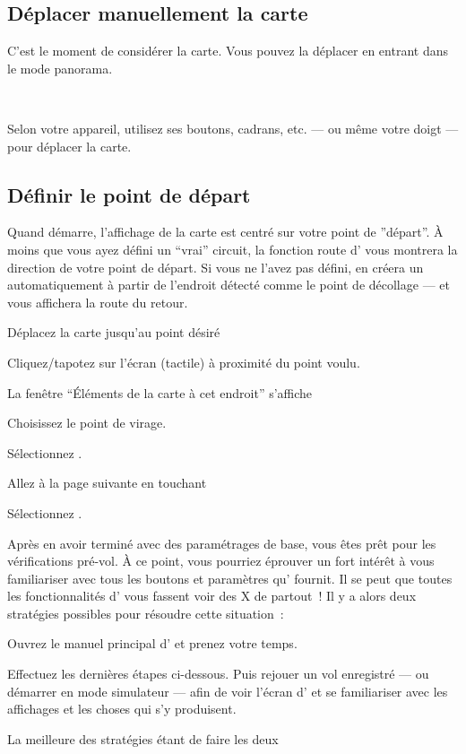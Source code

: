 \documentclass[french, a4paper, 12pt]{refrep}
\newcommand{\display}[3]{\bmenut{Display}{#1/2}{\LARGE$\triangleright$}~\bmenut{#2}{#3}}%
\begin{document}
\subsection{\textcolor{flashblue}{Déplacer manuellement la carte}}
C'est le moment de considérer la carte. Vous pouvez la déplacer en entrant dans le mode panorama.
\begin{flushleft}\hspace*{1cm}\display{1}{Panor.}{On}\\\end{flushleft}
Selon votre appareil, utilisez ses boutons, cadrans, etc. --- ou même votre doigt --- pour
déplacer la carte.

\subsection{\textcolor{flashblue}{Définir le point de départ}}
Quand \xc{} démarre, l'affichage de la carte est centré sur votre point de
''départ''. À moins que vous ayez défini un ``vrai'' circuit, la fonction route d'\xc{} vous
montrera la direction de votre point de départ. Si vous ne l'avez pas défini, \xc{} en créera un
automatiquement à partir de l'endroit détecté comme le point de décollage --- et
vous affichera la route du retour.
\begin{compactitem}
\item Déplacez la carte jusqu'au point désiré
\item Cliquez/tapotez sur l'écran (tactile) à proximité du point voulu.
\item La fenêtre ``Éléments de la carte à cet endroit'' s'affiche
\item Choisissez le point de virage.
\item Sélectionnez .
\item Allez à la page suivante en touchant \blink
\item Sélectionnez .
\end{compactitem}

Après en avoir terminé avec des paramétrages de base, vous êtes prêt pour
les vérifications pré-vol. À ce point, vous pourriez éprouver un fort intérêt
à vous familiariser avec tous les boutons et paramètres qu'\xc{} fournit.
Il se peut que toutes les fonctionnalités d'\xc{} vous fassent voir des X de partout~! Il
y a alors deux stratégies possibles pour résoudre cette situation~:
\begin{compactitem}
\item Ouvrez le manuel principal d'\xc{} et prenez votre temps.
\item Effectuez les dernières étapes ci-dessous. Puis rejouer un vol enregistré --- ou démarrer
\xc{} en mode simulateur --- afin de voir
l'écran d'\xc{} et se familiariser avec les affichages et les choses qui s'y produisent.
\end{compactitem}
La meilleure des stratégies étant de faire les deux\textellipsis
\end{document}
